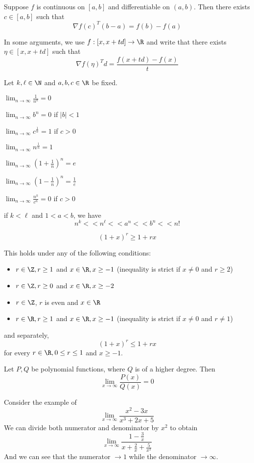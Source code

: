 Suppose $f$ is continuous on $[a,b]$ and differentiable on $(a,b)$. Then there
exists $c\in[a,b]$ such that
$$
  \nabla f(c)^T(b-a)=f(b)-f(a)
$$

In some arguments, we use $f:[x,x+td]\to\R$ and write that there exists
$\eta\in[x,x+td]$ such that
$$
  \nabla f(\eta)^Td=\frac{f(x+td)-f(x)}t
$$

\label{ffc8953}

Let $k,\ell\in\N$ and $a,b,c\in\R$ be fixed.
\begin{enumerata}
  \def\li{\displaystyle\lim_{n\to\infty}}
  \item $\li\frac1{n^k}=0$
  \item $\li b^n=0$ \quad if \quad $|b|<1$
  \item $\li c^{\frac1n}=1$ \quad if \quad $c>0$
  \item $\li n^{\frac1n}=1$
  \item $\li \left(1+\frac1n\right)^n=e$
  \item $\li \left(1-\frac1n\right)^n=\frac1e$
  \item $\li \frac{n^k}{c^n}=0$ \quad if \quad $c>0$
\end{enumerata}

if $k<\ell$ and $1<a<b$, we have
$$
  n^k << n^\ell << a^n << b^n << n!
$$

\label{d44713f}
$$
  (1+x)^r\geq 1+rx
$$

This holds under any of the following conditions:
\begin{itemize}
  \item $r\in\Z,r\geq1$ and $x\in\R,x\geq-1$ (inequality is strict if
        $x\neq0$ and $r\geq2$)
  \item $r\in\Z,r\geq0$ and $x\in\R,x\geq-2$
  \item $r\in\Z$, $r$ is even and $x\in\R$
  \item $r\in\R,r\geq1$ and $x\in\R,x\geq-1$ (inequality is strict if
        $x\neq0$ and $r\neq1$)
\end{itemize}

and separately,
$$
  (1+x)^r\leq 1+rx
$$
for every $r\in\R,0\leq r\leq 1$ and $x\geq-1$.

\label{ccfddb1}

Let $P,Q$ be polynomial functions, where $Q$ is of a higher degree. Then
$$
  \lim_{x\to\infty}\frac{P(x)}{Q(x)}=0
$$

\begin{compute}
  Consider the example of
  $$
    \lim_{x\to\infty}\frac{x^2 - 3x}{x^3 + 2x + 5}
  $$
  We can divide both numerator and denominator by $x^2$ to obtain
  $$
    \lim_{x\to\infty}\frac{1 - \frac3x}{x + \frac2x + \frac5{x^2}}
  $$
  And we can see that the numerator $\to1$ while the denominator
  $\to\infty$.
\end{compute}

